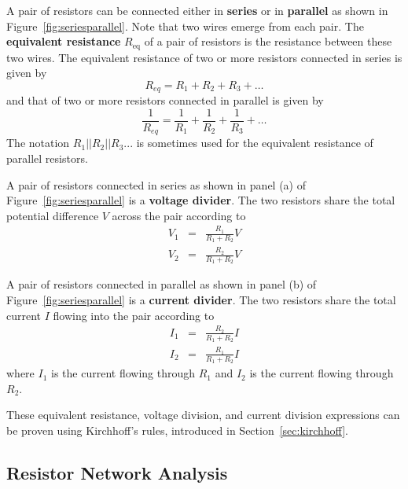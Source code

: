 \documentclass[11pt]{article}
\begin{document}
A pair of resistors can be connected either in \textbf{series} or in
\textbf{parallel} as shown in Figure~\ref{fig:seriesparallel}.  Note
that two wires emerge from each pair. The \textbf{equivalent
  resistance} $R_\mathrm{eq}$ of a pair of resistors is the resistance
between these two wires. The equivalent resistance of two or more
resistors connected in series is given by
\begin{equation}
  R_{eq} = R_1 + R_2 + R_3 + \ldots
  \label{eq:Rseries}
\end{equation}
and that of two or more resistors connected in parallel is given by
\begin{equation}
  \frac{1}{R_{eq}} = \frac{1}{R_1} + \frac{1}{R_2} + \frac{1}{R_3} +
  \ldots
  \label{eq:Rparallel}
\end{equation}
The notation $R_1||R_2||R_3...$ is sometimes used for the equivalent
resistance of parallel resistors.

A pair of resistors connected in series as shown in panel (a) of
Figure~\ref{fig:seriesparallel} is a \textbf{voltage divider}. The two
resistors share the total potential difference $V$ across the pair
according to
\begin{eqnarray}
  \nonumber V_1 & = & \frac{R_1}{R_1 + R_2} V \\ V_2 & = &
  \frac{R_2}{R_1 + R_2} V
  \label{eq:Vdiv}
\end{eqnarray}

A pair of resistors connected in parallel as shown in panel (b) of
Figure~\ref{fig:seriesparallel} is a \textbf{current divider}. The two
resistors share the total current $I$ flowing into the pair according
to
\begin{eqnarray}
  \nonumber I_1 & = & \frac{R_2}{R_1 + R_2} I \\ I_2 & = &
  \frac{R_1}{R_1 + R_2} I
  \label{eq:Idiv}
\end{eqnarray}
where $I_1$ is the current flowing through $R_1$ and $I_2$ is the
current flowing through $R_2$.

These equivalent resistance, voltage division, and current division
expressions can be proven using Kirchhoff's rules, introduced in
Section~\ref{sec:kirchhoff}.

\subsection{Resistor Network Analysis}
\label{sec:rnetwork}
\end{document}
